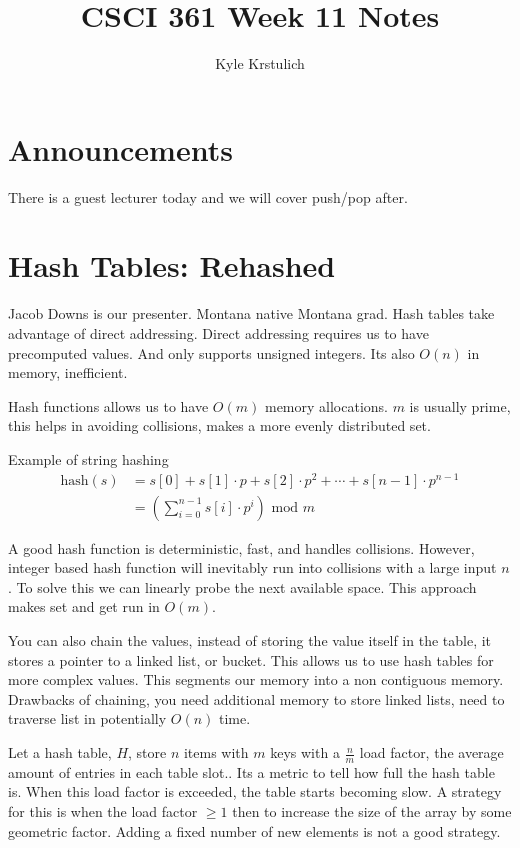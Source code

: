 \documentclass[12pt]{article}
\title{CSCI 361 Week 11 Notes}
\author{
  Kyle Krstulich
}
\begin{document}
\maketitle
\doublespacing

\section*{Announcements}
There is a guest lecturer today and we will cover push/pop after.


\section*{Hash Tables: Rehashed}
Jacob Downs is our presenter. Montana native Montana grad. Hash tables take advantage of direct
addressing. Direct addressing requires us to have precomputed values. And only supports unsigned
integers. Its also $O(n)$ in memory, inefficient.

Hash functions allows us to have $O(m)$ memory allocations. $m$ is usually prime, this helps in
avoiding collisions, makes a more evenly distributed set.

Example of string hashing
\begin{align*}
  \text{hash}(s) &= s[0] + s[1] \cdot p + s[2] \cdot p^2 + \cdots + s[n-1] \cdot p^{n-1}\\
                 &=\left(\sum_{i=0}^{n-1}s[i] \cdot p^i \right) \text{ mod } m
\end{align*}

A good hash function is deterministic, fast, and handles collisions. However, integer based hash
function will inevitably run into collisions with a large input $n$. To solve this we can linearly
probe the next available space. This approach makes set and get run in $O(m)$. 

You can also chain the values, instead of storing the value itself in the table, it stores a pointer
to a linked list, or bucket. This allows us to use hash tables for more complex values. This
segments our memory into a non contiguous memory. Drawbacks of chaining, you need additional memory
to store linked lists, need to traverse list in potentially $O(n)$ time.

Let a hash table, $H$, store $n$ items with $m$ keys with a $\frac{n}{m}$ load factor, the average
amount of entries in each table slot.. Its a metric to tell how full the hash table is. When this
load factor is exceeded, the table starts becoming slow. A strategy for this is when the load factor
$\geq 1$ then to increase the size of the array by some geometric factor. Adding a fixed number of
new elements is not a good strategy.
\end{document}
